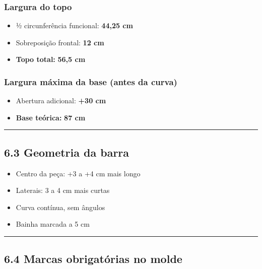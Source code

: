 \documentclass[
  10pt,oneside]{article}
\providecommand{\tightlist}{%
  \setlength{\itemsep}{0pt}\setlength{\parskip}{0pt}}
\begin{document}
\subsubsection{Largura do topo}\label{largura-do-topo}

\begin{itemize}
\tightlist
\item
  ½ circunferência funcional: \textbf{44,25 cm}
\item
  Sobreposição frontal: \textbf{12 cm}
\item
  \textbf{Topo total:} \textbf{56,5 cm}
\end{itemize}

\subsubsection{Largura máxima da base (antes da curva)}\label{largura-muxe1xima-da-base-antes-da-curva}

\begin{itemize}
\tightlist
\item
  Abertura adicional: \textbf{+30 cm}
\item
  \textbf{Base teórica:} \textbf{87 cm}
\end{itemize}

\begin{center}\rule{0.5\linewidth}{0.5pt}\end{center}

\subsection{6.3 Geometria da barra}\label{geometria-da-barra}

\begin{itemize}
\tightlist
\item
  Centro da peça: +3 a +4 cm mais longo
\item
  Laterais: 3 a 4 cm mais curtas
\item
  Curva contínua, sem ângulos
\item
  Bainha marcada a 5 cm
\end{itemize}

\begin{center}\rule{0.5\linewidth}{0.5pt}\end{center}

\subsection{6.4 Marcas obrigatórias no molde}\label{marcas-obrigatuxf3rias-no-molde}
\end{document}
